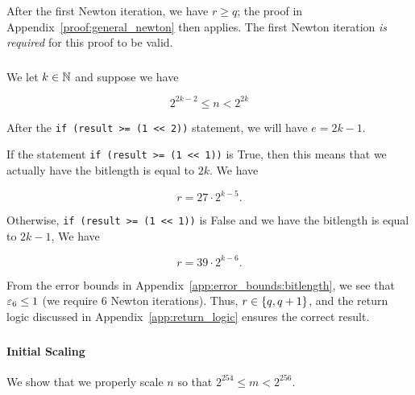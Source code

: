 \subsubsection{\WhileThree{}}

After the first Newton iteration, we have $r\ge q$;
the proof in Appendix~\ref{proof:general_newton} then applies.
The first Newton iteration \emph{is required} for this proof to be valid.

\subsubsection{\BitLength{}}
\label{app:conv_proof:bitlength}

We let $k\in\mathbb{N}$ and suppose we have

\begin{equation}
    2^{2k-2} \le n < 2^{2k}
\end{equation}

\noindent
After the \texttt{if (result >= (1 << 2))} statement,
we will have $e = 2k-1$.

If the statement \texttt{if (result >= (1 << 1))} is \textsf{True},
then this means that we actually have the bitlength is equal to $2k$.
We have

\begin{equation}
    r = 27\cdot 2^{k-5}.
\end{equation}

\noindent
Otherwise, \texttt{if (result >= (1 << 1))} is \textsf{False}
and we have the bitlength is equal to $2k-1$,
We have

\begin{equation}
    r = 39\cdot 2^{k-6}.
\end{equation}

From the error bounds in Appendix~\ref{app:error_bounds:bitlength},
we see that $\varepsilon_{6}\le1$ (we require 6 Newton iterations).
Thus, $r\in\left\{ q,q+1 \right\}$, and the return logic
discussed in Appendix~\ref{app:return_logic} ensures the correct result.

\subsubsection{\Linear{}}
\label{app:conv_proof:linear}

\paragraph{Initial Scaling}
We show that we properly scale $n$ so that $2^{254}\le m < 2^{256}$.

